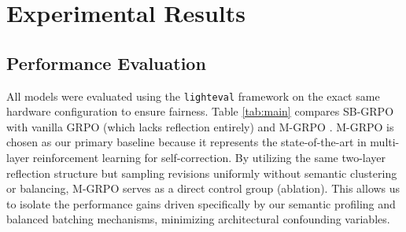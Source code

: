 \section{Experimental Results}

\subsection{Performance Evaluation}
All models were evaluated using the \texttt{lighteval} framework on the exact same hardware configuration to ensure fairness. Table \ref{tab:main} compares SB-GRPO with vanilla GRPO (which lacks reflection entirely) and M-GRPO \cite{ding2025multilayergrpoenhancingreasoning}. M-GRPO is chosen as our primary baseline because it represents the state-of-the-art in multi-layer reinforcement learning for self-correction. By utilizing the same two-layer reflection structure but sampling revisions uniformly without semantic clustering or balancing, M-GRPO serves as a direct control group (ablation). This allows us to isolate the performance gains driven specifically by our semantic profiling and balanced batching mechanisms, minimizing architectural confounding variables.

